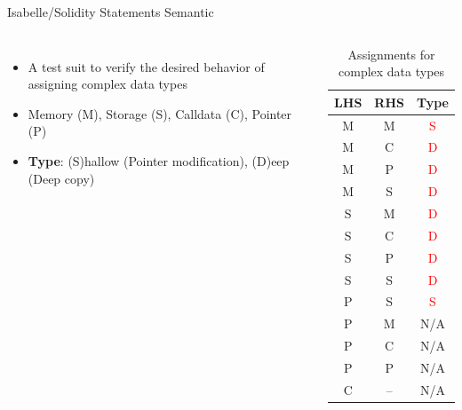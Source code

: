 \documentclass[aspectratio=169]{beamer}
\begin{document}
\begin{frame}{Isabelle/Solidity Statements Semantic}
\begin{columns}

\begin{itemize}
\item A test suit to verify the desired behavior of assigning complex data types
\item Memory (M), Storage (S), Calldata (C), Pointer (P)
\item \textbf{Type}: (S)hallow (Pointer modification), (D)eep (Deep copy)
\end{itemize}

\begin{table}[]

\caption{Assignments for complex data types}\label{tab:assign}
\vspace{-.5cm}
\begin{tabular}{ccc}
	\textbf{\small LHS}&\textbf{\small RHS}&\textbf{\small Type}\\
\hline
 M& M & \textcolor{red}{S} \\
M &  C&  \textcolor{red}{D}   \\
 M&  P&  \textcolor{red}{D} \\
M &  S&  \textcolor{red}{D}\\
S & M&   \textcolor{red}{D}\\
S & C&   \textcolor{red}{D}\\
S & P&   \textcolor{red}{D}\\
S & S& \textcolor{red}{D}\\
P& S& \textcolor{red}{S}\\
P&M&N/A\\
P&C&N/A\\
P&P&N/A\\
C&--&N/A
\end{tabular}
\end{table}
\end{columns}
\end{frame}
\end{document}
